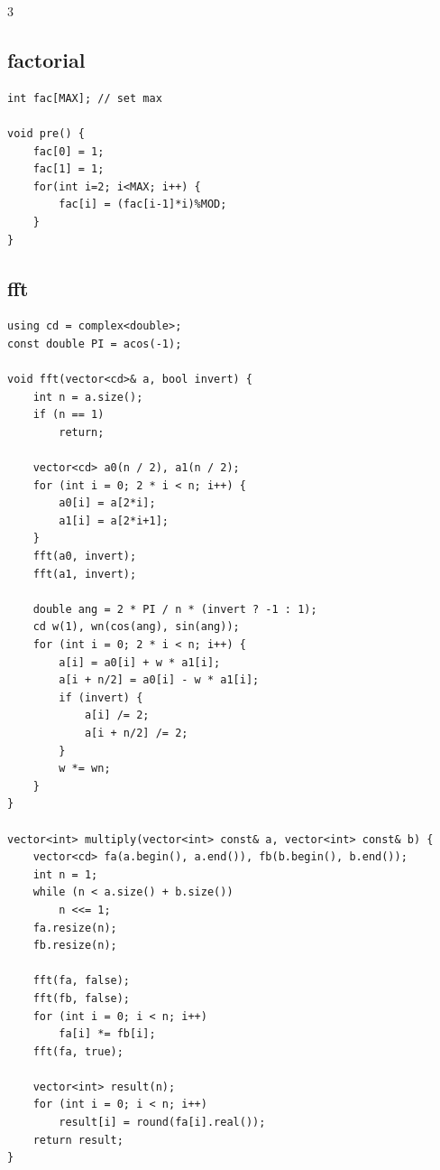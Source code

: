\documentclass[twoside]{article}
\begin{document}
\begin{multicols*}{3}
{\subsection*{factorial}
}
\begin{verbatim}
int fac[MAX]; // set max
 
void pre() {
    fac[0] = 1;
    fac[1] = 1;
    for(int i=2; i<MAX; i++) {
        fac[i] = (fac[i-1]*i)%MOD;
    }
}
\end{verbatim}

{
\subsection*{fft}
}
\begin{verbatim}
using cd = complex<double>;
const double PI = acos(-1);

void fft(vector<cd>& a, bool invert) {
    int n = a.size();
    if (n == 1)
        return;

    vector<cd> a0(n / 2), a1(n / 2);
    for (int i = 0; 2 * i < n; i++) {
        a0[i] = a[2*i];
        a1[i] = a[2*i+1];
    }
    fft(a0, invert);
    fft(a1, invert);

    double ang = 2 * PI / n * (invert ? -1 : 1);
    cd w(1), wn(cos(ang), sin(ang));
    for (int i = 0; 2 * i < n; i++) {
        a[i] = a0[i] + w * a1[i];
        a[i + n/2] = a0[i] - w * a1[i];
        if (invert) {
            a[i] /= 2;
            a[i + n/2] /= 2;
        }
        w *= wn;
    }
}

vector<int> multiply(vector<int> const& a, vector<int> const& b) {
    vector<cd> fa(a.begin(), a.end()), fb(b.begin(), b.end());
    int n = 1;
    while (n < a.size() + b.size()) 
        n <<= 1;
    fa.resize(n);
    fb.resize(n);

    fft(fa, false);
    fft(fb, false);
    for (int i = 0; i < n; i++)
        fa[i] *= fb[i];
    fft(fa, true);

    vector<int> result(n);
    for (int i = 0; i < n; i++)
        result[i] = round(fa[i].real());
    return result;
}
\end{verbatim}

{
}
\end{multicols*}
\end{document}
